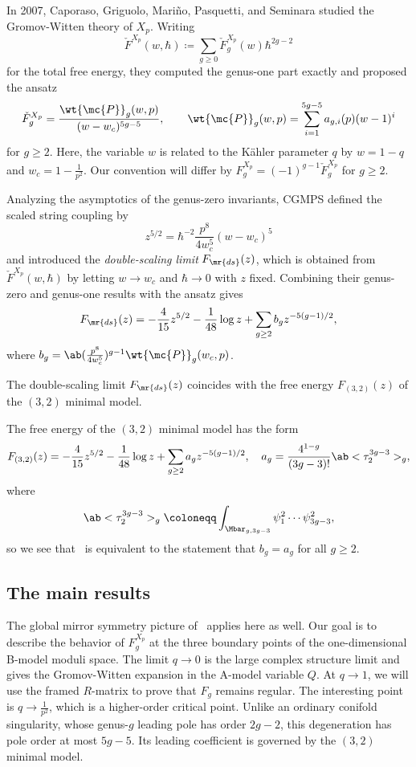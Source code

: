 In 2007, Caporaso, Griguolo, Mari\~{n}o, Pasquetti, and Seminara studied the Gromov-Witten theory of \(X_p\). Writing
\[ \check{F}^{X_p}(w,\hbar) \coloneqq \sum_{g \geq 0} \check{F}_g^{X_p}(w) \hbar^{2g-2} \]
for the total free energy, they computed the genus-one part exactly and proposed the ansatz
\begin{equation}\label{eqn:cgmps ansatz}
    \check{F}_g^{X_p} = \frac{\wt{\mc{P}}_g(w,p)}{(w-w_c)^{5g-5}}, \qquad \wt{\mc{P}}_g(w,p) = \sum_{i=1}^{5g-5} a_{g,i}(p)(w-1)^i
\end{equation}
for \(g \geq 2\). Here, the variable \(w\) is related to the Kähler parameter \(q\) by \(w = 1-q\) and \(w_c = 1 - \frac{1}{p^2}\). Our convention will differ by \(F_g^{X_p} = (-1)^{g-1}\check{F}_g^{X_p}\) for \(g \geq 2\).

Analyzing the asymptotics of the genus-zero invariants, CGMPS defined the scaled string coupling by
\[ z^{5/2} = \hbar^{-2} \frac{p^8}{4w_c^5}(w-w_c)^5 \]
and introduced the \textit{double-scaling limit} \(F_{\mr{ds}}(z)\), which is obtained from \(\check{F}^{X_p}(w,\hbar)\) by letting \(w \to w_c\) and \(\hbar \to 0\) with \(z\) fixed. Combining their genus-zero and genus-one results with the ansatz gives
\[ F_{\mr{ds}}(z) = -\frac{4}{15}z^{5/2} - \frac{1}{48}\log z + \sum_{g \geq 2} b_g z^{-5(g-1)/2}, \]
where \(b_g = \ab(\frac{p^8}{4w_c^5})^{g-1}\wt{\mc{P}}_g(w_c,p)\).

\begin{conj}%
\label{conj:cgmps}
    The double-scaling limit \(F_{\mr{ds}}(z)\) coincides with the free energy \(F_{(3,2)}(z)\) of the \((3,2)\) minimal model.
\end{conj}

The free energy of the \((3,2)\) minimal model has the form
\[ F_{(3,2)}(z) = -\frac{4}{15}z^{5/2} - \frac{1}{48}\log z + \sum_{g\geq2} a_g z^{-5(g-1)/2}, \quad a_g = \frac{4^{1-g}}{(3g-3)!}\ab<\tau_2^{3g-3}>_g, \]
where
\[ \ab<\tau_2^{3g-3}>_g \coloneqq \int_{\Mbar_{g,3g-3}} \psi_1^2 \cdots \psi_{3g-3}^2, \]
so we see that~ is equivalent to the statement that \(b_g = a_g\) for all \(g \geq 2\).

\subsection{The main results}%
\label{sub:The main results (Guo local P1)}

The global mirror symmetry picture of~ applies here as well. Our goal is to describe the behavior of \(F_g^{X_p}\) at the three boundary points of the one-dimensional B-model moduli space. The limit \(q \to 0\) is the large complex structure limit and gives the Gromov-Witten expansion in the A-model variable \(Q\). At \(q \to 1\), we will use the framed \(R\)-matrix to prove that \(F_g\) remains regular. The interesting point is \(q \to \frac{1}{p^2}\), which is a higher-order critical point. Unlike an ordinary conifold singularity, whose genus-\(g\) leading pole has order \(2g-2\), this degeneration has pole order at most \(5g-5\). Its leading coefficient is governed by the \((3,2)\) minimal model.

